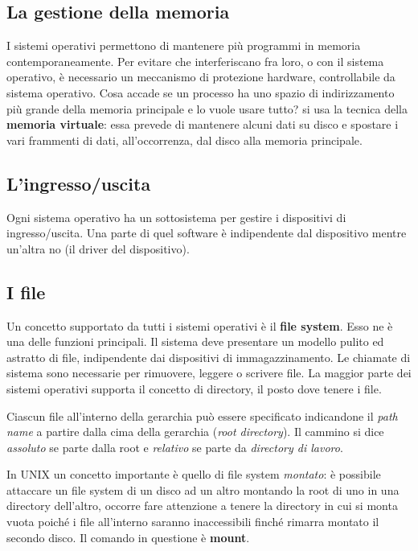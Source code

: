 \subsection{La gestione della memoria}

I sistemi operativi permettono di mantenere più programmi in memoria contemporaneamente. Per evitare che interferiscano fra loro, o con il sistema operativo, è necessario un meccanismo di protezione hardware, controllabile da sistema operativo.
Cosa accade se un processo ha uno spazio di indirizzamento più grande della memoria principale e lo vuole usare tutto? si usa la tecnica della \textbf{memoria virtuale}: essa prevede di mantenere alcuni dati su disco e spostare i vari frammenti di dati, all'occorrenza, dal disco alla memoria principale.

\subsection{L'ingresso/uscita}

Ogni sistema operativo ha un sottosistema per gestire i dispositivi di ingresso/uscita. Una parte di quel software è indipendente dal dispositivo mentre un'altra no (il driver del dispositivo).

\subsection{I file}

Un concetto supportato da tutti i sistemi operativi è il \textbf{file system}. Esso ne è una delle funzioni principali. Il sistema deve presentare un modello pulito ed astratto di file, indipendente dai dispositivi di immagazzinamento.
Le chiamate di sistema sono necessarie per rimuovere, leggere o scrivere file.
La maggior parte dei sistemi operativi supporta il concetto di directory, il posto dove tenere i file.

Ciascun file all'interno della gerarchia può essere specificato indicandone il \textit{path name} a partire dalla cima della gerarchia (\textit{root directory}). Il cammino si dice \textit{assoluto} se parte dalla root e \textit{relativo} se parte da \textit{directory di lavoro}.

In UNIX un concetto importante è quello di file system \textit{montato}: è possibile attaccare un file system di un disco ad un altro montando la root di uno in una directory dell'altro, occorre fare attenzione a tenere la directory in cui si monta vuota poiché i file all'interno saranno inaccessibili finché rimarra montato il secondo disco. Il comando in questione è \textbf{mount}.

